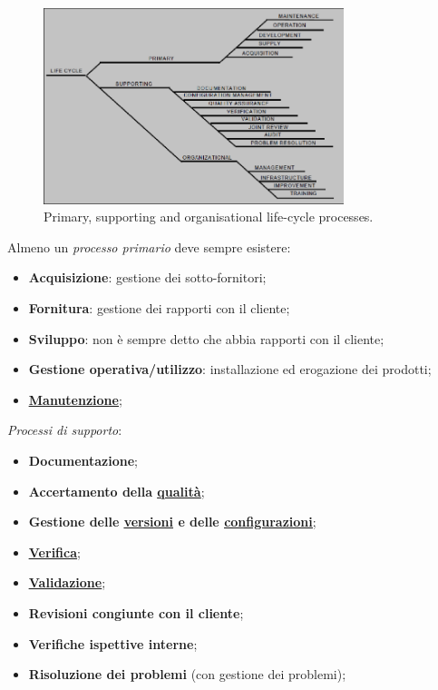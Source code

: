 			\begin{figure}[H]
				\centering
				\includegraphics[width=0.78\textwidth]{img/iso}		
				\caption{Primary, supporting and organisational life-cycle processes.}
			\end{figure} 
			
			Almeno un \textit{processo primario} deve sempre esistere:
				\begin{itemize}
					\item \textbf{Acquisizione}: gestione dei sotto-fornitori;
					\item \textbf{Fornitura}: gestione dei rapporti con il cliente;
					\item \textbf{Sviluppo}: non è sempre detto che abbia rapporti con il cliente;
					\item \textbf{Gestione operativa/utilizzo}: installazione ed erogazione dei prodotti;
					\item \textbf{\underline{\hyperref[manutenzione]{Manutenzione}}};
				\end{itemize}
			
			\textit{Processi di supporto}:
				\begin{itemize}
					\item \textbf{Documentazione};
					\item \textbf{Accertamento della \underline{\hyperref[qualita]{qualità}}};
					\item \textbf{Gestione delle \underline{\hyperref[versione]{versioni}} e delle \underline{\hyperref[configurazione]{configurazioni}}};
					\item \textbf{\underline{\hyperref[verificare]{Verifica}}};
					\item \textbf{\underline{\hyperref[validare]{Validazione}}};
					\item \textbf{Revisioni congiunte con il cliente};
					\item \textbf{Verifiche ispettive interne};
					\item \textbf{Risoluzione dei problemi} (con gestione dei problemi);		
				\end{itemize}
			
